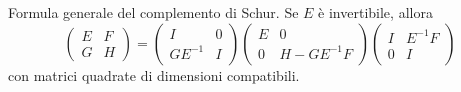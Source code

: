 \documentclass[a4paper]{article}
\begin{document}
\pagebreak

Formula generale del complemento di Schur. Se \(E\) è invertibile, allora
\[
    \begin{pmatrix}
        E & F \\
        G & H
    \end{pmatrix}
    =
    \begin{pmatrix}
        I & 0 \\
        GE^{-1} & I
    \end{pmatrix}
    \begin{pmatrix}
        E & 0 \\
        0 & H-GE^{-1}F
    \end{pmatrix}
    \begin{pmatrix}
        I & E^{-1}F \\
        0 & I
    \end{pmatrix}
\]
con matrici quadrate di dimensioni compatibili.
\end{document}
